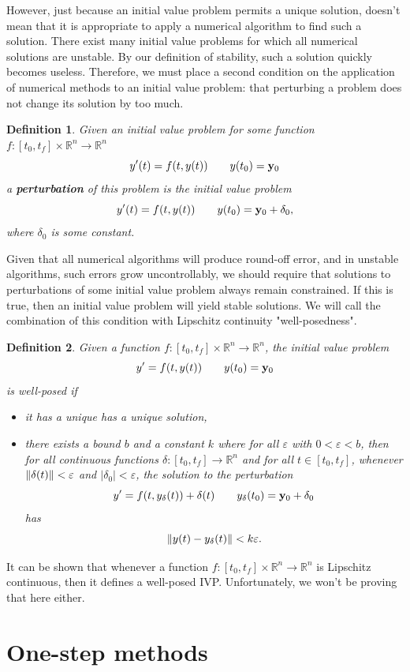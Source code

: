 \documentclass{article}
\newtheorem{definition}{Definition}[section]
\newcommand{\R}{\mathbb{R}}
\newcommand{\y}{\vb{y}}
\newcommand{\0}{\vb{0}}
\begin{document}
However, just because an initial value problem permits a unique solution, doesn't mean that it is appropriate to apply a numerical algorithm to find such a solution. There exist many initial value problems for which all numerical solutions are unstable. By our definition of stability, such a solution quickly becomes useless. Therefore, we must place a second condition on the application of numerical methods to an initial value problem: that perturbing a problem does not change its solution by too much.

\begin{definition}
  Given an initial value problem for some function $f: [t_0, t_f] \times \R^n \to \R^n$
  \[y'(t) = f(t, y(t)) \qquad y(t_0) = \y_0\]
  a \textbf{perturbation} of this problem is the initial value problem
  \[y'(t) = f(t, y(t)) \qquad y(t_0) = \y_0 + \delta_0,\]
  where $\delta_0$ is some constant.
\end{definition}
Given that all numerical algorithms will produce round-off error, and in unstable algorithms, such errors grow uncontrollably, we should require that solutions to perturbations of some initial value problem always remain constrained. If this is true, then an initial value problem will yield stable solutions. We will call the combination of this condition with Lipschitz continuity "well-posedness".
\begin{definition}
  Given a function $f: [t_0, t_f]\times\R^n\to\R^n$, the initial value problem
  \[y' = f(t, y(t)) \qquad y(t_0) = \y_0\]
  is well-posed if
  \begin{itemize}
    \item it has a unique has a unique solution,
    \item there exists a bound $b$ and a constant $k$ where for all $\varepsilon$ with $0 < \varepsilon < b$, then for all continuous functions $\delta: [t_0, t_f]\to\R^n$ and for all $t \in [t_0, t_f]$, whenever $\norm{\delta(t)} < \varepsilon$ and $|\delta_0| < \varepsilon$, the solution to the perturbation
      \[y' = f(t, y_{\delta}(t)) + \delta(t) \qquad y_{\delta}(t_0) = \y_0 + \delta_0\]
      has 
      \[\norm{y(t) - y_{\delta}(t)} < k\varepsilon.\]
  \end{itemize}
\end{definition}
  It can be shown that whenever a function $f: [t_0, t_f]\times\R^n \to \R^n$ is Lipschitz continuous, then it defines a well-posed IVP. Unfortunately, we won't be proving that here either. 

\section{One-step methods}
\end{document}
